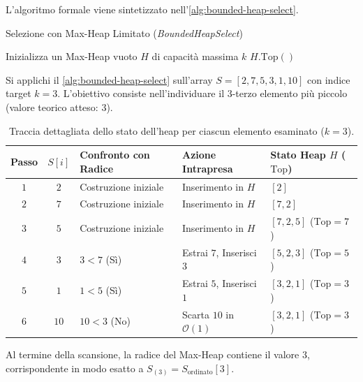 L'algoritmo formale viene sintetizzato nell'\autoref{alg:bounded-heap-select}.

\begin{algorithm}[H]
\caption{Selezione con Max-Heap Limitato (\textit{BoundedHeapSelect})}
\label{alg:bounded-heap-select}

Inizializza un Max-Heap vuoto $H$ di capacità massima $k$\;
\Return $H.\text{Top}()$ 
\end{algorithm}

\begin{example}
Si applichi il \autoref{alg:bounded-heap-select} sull'array $S = [2, 7, 5, 3, 1, 10]$ con indice target $k = 3$. L'obiettivo consiste nell'individuare il 3-terzo elemento più piccolo (valore teorico atteso: $3$).

\begin{table}[H]
  \centering
  \small
  \caption{Traccia dettagliata dello stato dell'heap per ciascun elemento esaminato ($k=3$).}
  \label{tab:heap-selection-trace}
  \begin{tabularx}{\textwidth}{@{}>{\bfseries\arraybackslash}ccp{3.5cm}Yl@{}}
    \toprule
    Passo & $S[i]$ & Confronto con Radice & Azione Intrapresa & Stato Heap $H$ ($\text{Top}$) \\
    \midrule
    $1$ & $2$ & Costruzione iniziale & Inserimento in $H$ & $[2]$ \\
    $2$ & $7$ & Costruzione iniziale & Inserimento in $H$ & $[7, 2]$ \\
    $3$ & $5$ & Costruzione iniziale & Inserimento in $H$ & $[7, 2, 5]$ ($\text{Top} = 7$) \\
    \midrule
    $4$ & $3$ & $3 < 7$ (Sì) & Estrai $7$, Inserisci $3$ & $[5, 2, 3]$ ($\text{Top} = 5$) \\
    $5$ & $1$ & $1 < 5$ (Sì) & Estrai $5$, Inserisci $1$ & $[3, 2, 1]$ ($\text{Top} = 3$) \\
    $6$ & $10$ & $10 < 3$ (No) & Scarta $10$ in $\mathcal{O}(1)$ & $[3, 2, 1]$ ($\text{Top} = 3$) \\
    \bottomrule
  \end{tabularx}
\end{table}

Al termine della scansione, la radice del Max-Heap contiene il valore $3$, corrispondente in modo esatto a $S_{(3)} = S_{\text{ordinato}}[3]$.
\end{example}

